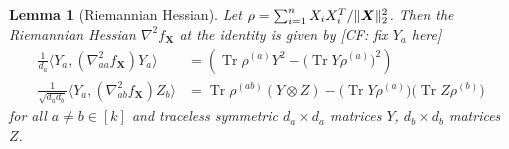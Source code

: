 \documentclass{article}
\newtheorem{lemma}[theorem]{Lemma}
\DeclarePairedDelimiter{\norm}{\lVert}{\rVert}
\newcommand{\ot}{\otimes}
\renewcommand{\vec}{\bm}
\newcommand\tr{\operatorname{Tr}}
\newcommand{\CF}[1]{{\color{purple}[CF: #1]}}
\begin{document}
\begin{lemma}[Riemannian Hessian]\label{lem:hessian}
Let $\rho = \sum_{i=1}^n X_i X_i^T / \norm{\vec X}_2^2$.
Then the Riemannian Hessian $\nabla^2 f_{\vec X}$ at the identity is given by \CF{fix $Y_a$ here}
\begin{align*}
 \frac{1}{d_a} \langle Y_a,  \left( \nabla^2_{aa} f_{\vec X} \right) Y_a \rangle
&= \left( \tr \rho^{(a)} Y^2 - \bigl(\tr Y \rho^{(a)}\bigr)^2 \right) \\
  \frac1{\sqrt{d_a d_b}} \langle Y_a,  \left( \nabla^2_{ab} f_{\vec X} \right) Z_b \rangle
&= \tr \rho^{(ab)} \left( Y \ot Z \right) - \bigl(\tr Y \rho^{(a)}\bigr)\bigl(\tr Z \rho^{(b)}\bigr) 
\end{align*}
for all $a\neq b\in[k]$ and traceless symmetric $d_a\times d_a$ matrices $Y$, $d_b\times d_b$ matrices~$Z$.
\end{lemma}
\end{document}
